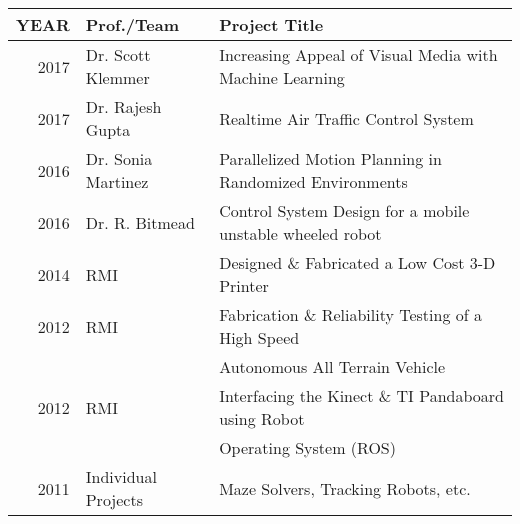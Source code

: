 \documentclass[]{deedy-resume-openfont}
\begin{document}
\begin{minipage}[t]{0.66\textwidth}
\begin{tabular}{rll}
YEAR	     & Prof./Team  & Project Title \\
\hline
2017	     & Dr. Scott Klemmer & Increasing Appeal of Visual Media with Machine Learning\\
2017	     & Dr. Rajesh Gupta & Realtime Air Traffic Control System \\ 
2016         & Dr. Sonia Martinez & Parallelized Motion Planning in Randomized Environments\\
2016         &Dr. R. Bitmead & Control System Design for a mobile unstable wheeled robot\\
2014	     & RMI  & Designed \& Fabricated a Low Cost 3-D Printer\\
2012	     & RMI & Fabrication \& Reliability Testing of a High Speed \\& & Autonomous All Terrain Vehicle\\
2012	     & RMI & Interfacing the Kinect \& TI Pandaboard using Robot \\& & Operating System (ROS)\\
2011        &  Individual Projects & Maze Solvers, Tracking Robots, etc.\\
\end{tabular}
\sectionsep








\end{minipage} 
\end{document}
